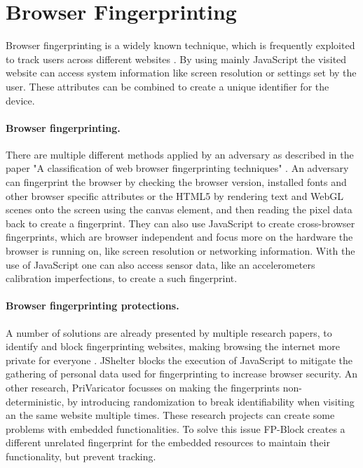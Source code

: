 \documentclass[11pt,
  oneside,openany,    %
]{scrreprt}
\begin{document}
\section{Browser Fingerprinting}
\label{sec:browser_fingerprint}
Browser fingerprinting is a widely known technique, which is frequently exploited to track users across different websites \cite{polvcak2022jshelter}.
By using mainly JavaScript the visited website can access system information like screen resolution or settings set by the user.
These attributes can be combined to create a unique identifier for the device.

\paragraph{Browser fingerprinting.}
\label{par:browser_fingerprint}
There are multiple different methods applied by an adversary as described in the paper "A classification of web browser fingerprinting techniques" \cite{upathilake2015classification}.
An adversary can fingerprint the browser by checking the browser version, installed fonts and other browser specific attributes or the HTML5 by rendering text and WebGL scenes onto the screen using the canvas element, and then reading the pixel data back to create a fingerprint.
They can also use JavaScript to create cross-browser fingerprints, which are browser independent and focus more on the hardware the browser is running on, like screen resolution or networking information.
With the use of JavaScript one can also access sensor data, like an accelerometers calibration imperfections, to create a such fingerprint.

\paragraph{Browser fingerprinting protections.}
\label{par:browser_fingerprint_protect}
A number of solutions are already presented by multiple research papers, to identify and block fingerprinting websites, making browsing the internet more private for everyone \cite{faizkhademi2015fpguard, polvcak2022jshelter, nikiforakis2015privaricator, torres2015fp}.
JShelter \cite{polvcak2022jshelter} blocks the execution of JavaScript to mitigate the gathering of personal data used for fingerprinting to increase browser security.
An other research, PriVaricator \cite{nikiforakis2015privaricator} focusses on making the fingerprints non-deterministic, by introducing randomization to break identifiability when visiting an the same website multiple times.
These research projects can create some problems with embedded functionalities.
To solve this issue FP-Block \cite{torres2015fp} creates a different unrelated fingerprint for the embedded resources to maintain their functionality, but prevent tracking.
\end{document}
